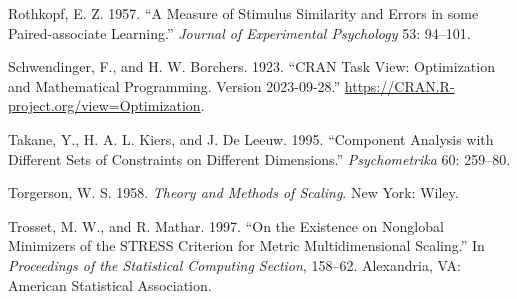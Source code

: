 \documentclass[
  12pt,
]{article}
\newlength{\cslhangindent}
\newenvironment{CSLReferences}[2] %
 {\begin{list}{}{%
  \setlength{\itemindent}{0pt}
  \setlength{\leftmargin}{0pt}
  \setlength{\parsep}{0pt}
  \ifodd #1
   \setlength{\leftmargin}{\cslhangindent}
   \setlength{\itemindent}{-1\cslhangindent}
  \fi
  \setlength{\itemsep}{#2\baselineskip}}}
 {\end{list}}
\begin{document}
\begin{CSLReferences}{1}{0}
Rothkopf, E. Z. 1957. {``{A Measure of Stimulus Similarity and Errors in some Paired-associate Learning}.''} \emph{Journal of Experimental Psychology} 53: 94--101.

Schwendinger, F., and H. W. Borchers. 1923. {``CRAN Task View: Optimization and Mathematical Programming. Version 2023-09-28.''} \url{https://CRAN.R-project.org/view=Optimization}.

Takane, Y., H. A. L. Kiers, and J. De Leeuw. 1995. {``Component Analysis with Different Sets of Constraints on Different Dimensions.''} \emph{Psychometrika} 60: 259--80.

Torgerson, W. S. 1958. \emph{{Theory and Methods of Scaling}}. New York: Wiley.

Trosset, M. W., and R. Mathar. 1997. {``{On the Existence on Nonglobal Minimizers of the STRESS Criterion for Metric Multidimensional Scaling}.''} In \emph{Proceedings of the Statistical Computing Section}, 158--62. Alexandria, VA: American Statistical Association.

\end{CSLReferences}
\end{document}
